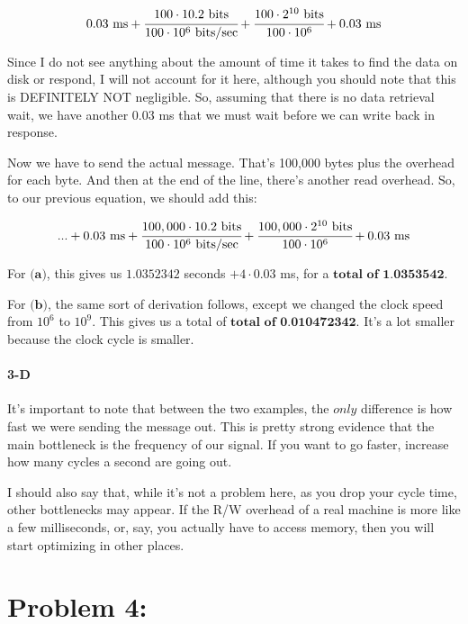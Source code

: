 \documentclass[a4paper]{article}
\begin{document}
\begin{equation}
0.03 \mbox{ ms} + \cfrac{100 \cdot 10.2 \mbox{ bits}}{100 \cdot 10^6 \mbox{ bits/sec}} + \cfrac{100 \cdot 2^{10} \mbox{ bits}}{100 \cdot 10^6} + 0.03 \mbox{ ms}
\end{equation}

Since I do not see anything about the amount of time it takes to find the data on disk or respond, I will not account for it here, although you should note that this is DEFINITELY NOT negligible. So, assuming that there is no data retrieval wait, we have another 0.03 ms that we must wait before we can write back in response.

Now we have to send the actual message. That's 100,000 bytes plus the overhead for each byte. And then at the end of the line, there's another read overhead. So, to our previous equation, we should add this:

\begin{equation}
... + 0.03 \mbox{ ms} + \cfrac{100,000 \cdot 10.2 \mbox{ bits}}{100 \cdot 10^6 \mbox{ bits/sec}} + \cfrac{100,000 \cdot 2^{10} \mbox{ bits}}{100 \cdot 10^6} + 0.03 \mbox{ ms}
\end{equation}

For $\textbf{(a)}$, this gives us $1.0352342$ seconds $+ 4 \cdot 0.03$ ms, for a $\textbf{total of 1.0353542}$.

For $\textbf{(b)}$, the same sort of derivation follows, except we changed the clock speed from $10^6$ to $10^9$. This gives us a total of $\textbf{total of 0.010472342}$. It's a lot smaller because the clock cycle is smaller.

\paragraph{3-D} It's important to note that between the two examples, the $\textit{only}$ difference is how fast we were sending the message out. This is pretty strong evidence that the main bottleneck is the frequency of our signal. If you want to go faster, increase how many cycles a second are going out.

I should also say that, while it's not a problem here, as you drop your cycle time, other bottlenecks may appear. If the R/W overhead of a real machine is more like a few milliseconds, or, say, you actually have to access memory, then you will start optimizing in other places.

\section*{Problem 4:}
\end{document}
